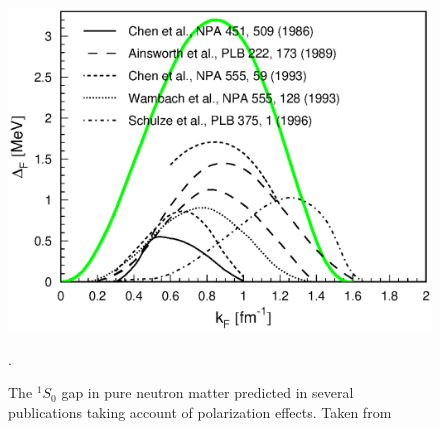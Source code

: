 \documentclass[rmp,aps,floatfix]{revtex4}
\begin{document}
\begin{figure}
\includegraphics[totalheight=12cm,angle=0,bb=0 350 500 700]{dean_hjorthjensen_fig14.ps}
\caption{The $^1S_0$ gap in pure neutron matter 
predicted in several publications
taking account of polarization effects.
Taken from \cite{ls2000}\label{fig:screening}}.
\end{figure}
\end{document}
